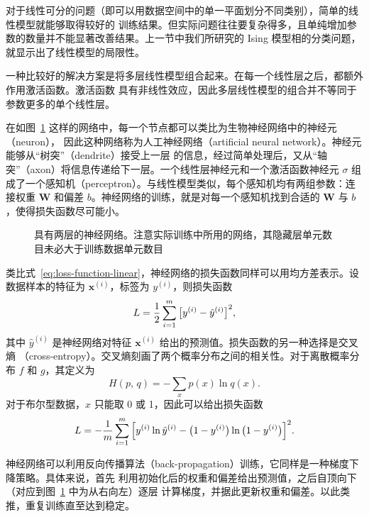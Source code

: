 对于线性可分的问题（即可以用数据空间中的单一平面划分不同类别），简单的线性模型就能够取得较好的
训练结果。但实际问题往往要复杂得多，且单纯增加参数的数量并不能显著改善结果。上一节中我们所研究的
Ising 模型相的分类问题，就显示出了线性模型的局限性。

一种比较好的解决方案是将多层线性模型组合起来。在每一个线性层之后，都额外作用激活函数。激活函数
具有非线性效应，因此多层线性模型的组合并不等同于参数更多的单个线性层。

在如图~\ref{fig:neural-net} 这样的网络中，每一个节点都可以类比为生物神经网络中的神经元（neuron），
因此这种网络称为人工神经网络（artificial neural network）。神经元能够从“树突”（dendrite）接受上一层
的信息，经过简单处理后，又从“轴突”（axon）将信息传递给下一层。一个线性层神经元和一个激活函数神经元
$\sigma$ 组成了一个感知机（perceptron）。与线性模型类似，每个感知机均有两组参数：连接权重 $\bm{W}$
和偏差 $b$。神经网络的训练，就是对每一个感知机找到合适的 $\bm{W}$ 与 $b$，使得损失函数尽可能小。

\begin{figure}[htb]
  \centering
  \caption{具有两层的神经网络。注意实际训练中所用的网络，其隐藏层单元数目未必大于训练数据单元数目}
  \label{fig:neural-net}
\end{figure}

类比式~\eqref{eq:loss-function-linear}，神经网络的损失函数同样可以用均方差表示。设数据样本的特征为
$\bm{x}^{(i)}$，标签为 $y^{(i)}$，则损失函数
\begin{equation}
  L = \frac{1}{2} \sum_{i=1}^m \qty\big[y^{(i)} - \hat{y}^{(i)}]^2,
\end{equation}
其中 $\hat{y}^{(i)}$ 是神经网络对特征 $\bm{x}^{(i)}$ 给出的预测值。损失函数的另一种选择是交叉熵
（cross-entropy）。交叉熵刻画了两个概率分布之间的相关性。对于离散概率分布 $f$ 和 $g$，其定义为
\begin{equation}
  H(p,\,q) = - \sum_x p(x) \ln q(x).
\end{equation}
对于布尔型数据，$x$ 只能取 0 或 1，因此可以给出损失函数
\begin{equation}
  L = - \frac{1}{m} \sum_{i=1}^m
        \qty\Big[y^{(i)}\ln\hat{y}^{(i)} - \qty\big(1-y^{(i)})\ln\qty\big(1-y^{(i)})]^2.
\end{equation}

神经网络可以利用反向传播算法（back-propagation）训练，它同样是一种梯度下降策略。具体来说，首先
利用初始化后的权重和偏差给出预测值，之后自顶向下（对应到图~\ref{fig:neural-net} 中为从右向左）逐层
计算梯度，并据此更新权重和偏差。以此类推，重复训练直至达到稳定。

